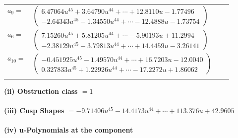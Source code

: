 \documentclass[1p]{elsarticle_modified}
\theoremstyle{definition}
\begin{document}
\begin{tabular}{m{7pt} m{180pt} m{7pt} m{180pt} }
\flushright $a_{9}=$&$\begin{pmatrix}6.47064 u^{45}+3.64790 u^{44}+\cdots+12.8110 u-1.77496\\-2.64343 u^{45}-1.34550 u^{44}+\cdots-12.4888 u-1.73754\end{pmatrix}$ \\
\flushright $a_{6}=$&$\begin{pmatrix}7.15260 u^{45}+5.81205 u^{44}+\cdots-5.90193 u+11.2994\\-2.38129 u^{45}-3.79813 u^{44}+\cdots+14.4459 u-3.26141\end{pmatrix}$ \\
\flushright $a_{10}=$&$\begin{pmatrix}-0.451925 u^{45}-1.49570 u^{44}+\cdots+16.7203 u-12.0040\\0.327833 u^{45}+1.22926 u^{44}+\cdots-17.2272 u+1.86062\end{pmatrix}$\\&\end{tabular}
\flushleft \textbf{(ii) Obstruction class $= 1$}\\~\\
\flushleft \textbf{(iii) Cusp Shapes $= -9.71406 u^{45}-14.4173 u^{44}+\cdots+113.376 u+42.9605$}\\~\\
\newpage\renewcommand{\arraystretch}{1}
\flushleft \textbf{(iv) u-Polynomials at the component}\newline \\
\end{document}
